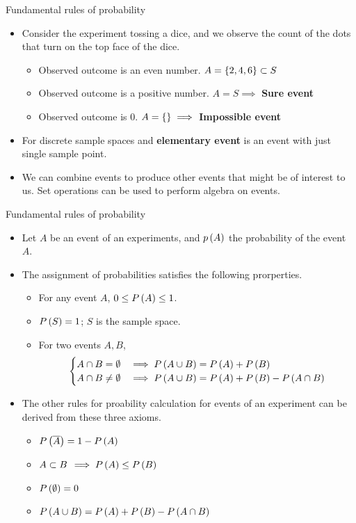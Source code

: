 \documentclass[aspectratio=169]{beamer}
\let\olditem\item
\renewcommand{\item}{\setlength{\itemsep}{\fill}\olditem}
\def\lp{\ensuremath\left(}
\def\rp{\ensuremath\right)}
\def\lc{\ensuremath\left\{}
\def\rc{\ensuremath\right\}}
\newcommand{\ct}[1]{\lp #1\rp}
\begin{document}
\begin{frame}[t]{Fundamental rules of probability}
\begin{itemize}
  \item Consider the experiment tossing a dice, and we observe the count of the dots that turn on the top face of the dice.
  \begin{itemize}
    \item Observed outcome is an even number. $A = \lc 2, 4, 6\rc \subset S$
    \item Observed outcome is a positive number. $A = S \implies $ \textbf{Sure event}
    \item Observed outcome is 0. $A = \lc\rc \implies $ \textbf{Impossible event}
  \end{itemize}
  
  \item For discrete sample spaces and \textbf{elementary event} is an event with just single sample point.
  
  \item We can combine events to produce other events that might be of interest to us. Set operations can be used to perform algebra on events.
\end{itemize}
\end{frame}


\begin{frame}[t]{Fundamental rules of probability}
\begin{itemize}
  \item Let $A$ be an event of an experiments, and $p\ct{A}$ the probability of the event $A$.
  
  \item The assignment of probabilities satisfies the following prorperties.
  \begin{itemize}
    \item For any event $A$, $0 \leq P\lp A \rp \leq 1$.
    \item $P\lp S \rp = 1$; $S$ is the sample space.
    \item For two events $A, B$, 
    \[ \begin{cases}
      A \cap B = \emptyset & \implies P\lp A \cup B\rp = P\lp A\rp + P\lp B\rp\\
      A \cap B \neq \emptyset & \implies P\lp A \cup B\rp = P\lp A\rp + P\lp B\rp - P\lp A \cap B\rp
       \end{cases} \]
  \end{itemize}

  \item  The other rules for proability calculation for events of an experiment can be derived from these three axioms.
  \begin{itemize}
    \item $P\lp \overline{A}\rp = 1 - P\lp A \rp$
    \item $A \subset B \, \implies P\lp A \rp \leq P\lp B\rp$
    \item $P\lp \emptyset \rp = 0$
    \item $P\lp A \cup B \rp = P\lp A\rp + P\lp B\rp - P\lp A \cap B\rp$
  \end{itemize}
\end{itemize}
\end{frame}
\end{document}
